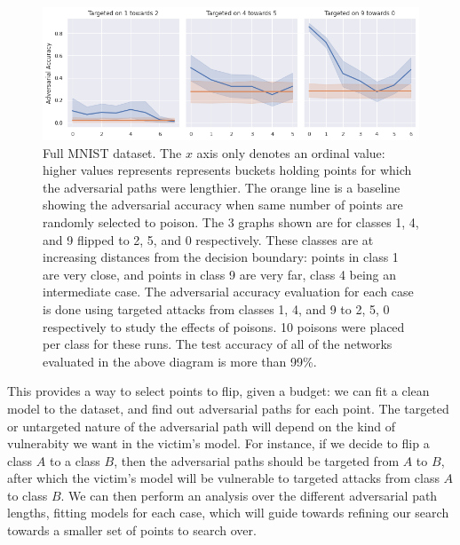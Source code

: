 \documentclass[12pt, oneside]{book}
\begin{document}
    \begin{figure}[!h]
        \centering
        \includegraphics[scale=0.5]{targeted-mnist-pgd-path-trick.png}
        \caption{Full MNIST dataset. The $x$ axis only denotes an ordinal value:
        higher values represents represents buckets holding points for which the
        adversarial paths were lengthier. The orange line is a baseline showing
        the adversarial accuracy when same number of points are randomly
        selected to poison. The 3 graphs shown are for classes 1, 4, and 9
        flipped to 2, 5, and 0 respectively. These classes are at increasing
        distances from the decision boundary: points in class 1 are very close,
        and points in class 9 are very far, class 4 being an intermediate case.
        The adversarial accuracy evaluation for each case is done using targeted
        attacks from classes 1, 4, and 9 to 2, 5, 0 respectively to study the
        effects of poisons. 10 poisons were placed per class for these runs. The
        test accuracy of all of the networks evaluated in the above diagram is
        more than 99\%.}
        \label{fig:full-MNIST-curve}
    \end{figure}


This provides a way to select points to flip, given a budget: we can fit a clean
model to the dataset, and find out adversarial paths for each point. The
targeted or untargeted nature of the adversarial path will depend on the kind of
vulnerabity we want in the victim's model. For instance, if we decide to flip a
class $A$ to a class $B$, then the adversarial paths should be targeted from $A$
to $B$, after which the victim's model will be vulnerable to targeted attacks
from class $A$ to class $B$. We can then perform an analysis over the different
adversarial path lengths, fitting models for each case, which will guide towards
refining our search towards a smaller set of points to search over.
\end{document}
